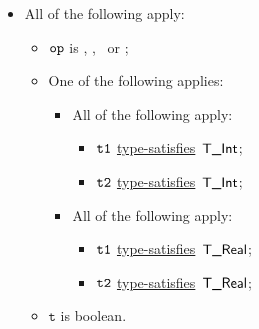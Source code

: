 \documentclass{book}
\newcommand\typesatisfies[0]{\hyperlink{def-typesatisfies}{type-satisfies}}
\newcommand\vt[0]{\texttt{t}}
\begin{document}
\begin{itemize}
  \item All of the following apply:
  \begin{itemize}
    \item $\texttt{op}$ is \LEQ, \GEQ, \GT\ or \LT;
    \item One of the following applies:
    \begin{itemize}
      \item All of the following apply:
      \begin{itemize}
        \item $\texttt{t1}$ \typesatisfies\  $\textsf{T\_Int}$;
        \item $\texttt{t2}$ \typesatisfies\  $\textsf{T\_Int}$;
      \end{itemize}
      \item All of the following apply:
      \begin{itemize}
        \item $\texttt{t1}$ \typesatisfies\  $\textsf{T\_Real}$;
        \item $\texttt{t2}$ \typesatisfies\  $\textsf{T\_Real}$;
      \end{itemize}
    \end{itemize}
    \item $\vt$ is boolean.
  \end{itemize}


\end{itemize}
\end{document}
